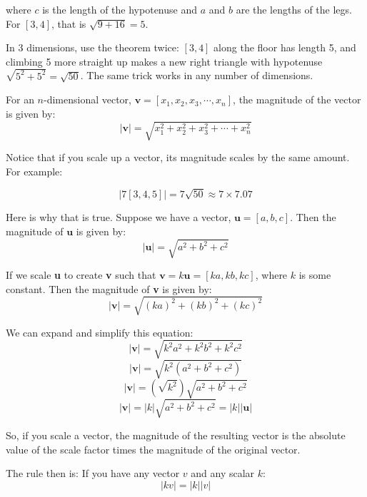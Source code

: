 where $c$ is the length of the hypotenuse and $a$ and $b$ are the lengths of
the legs. For $[3, 4]$, that is $\sqrt{9 + 16} = 5$.

In 3 dimensions, use the theorem twice: $[3, 4]$ along the floor has
length 5, and climbing 5 more straight up makes a new right triangle with
hypotenuse $\sqrt{5^2 + 5^2} = \sqrt{50}$. The same trick works in any
number of dimensions. 
\vspace*{1cm}

\begin{mdframed}[style = important, frametitle = {Magnitude of Vectors}]
For an $n$-dimensional vector, $\textbf{v} = \left[ x_1, x_2, x_3, \cdots, x_n 
\right]$, the magnitude of the vector is given by:
$$\left| \textbf{v} \right| = \sqrt{x_1^2 + x_2^2 + x_3^2 + \cdots + x_n^2}$$
\end{mdframed}

Notice that if you scale up a vector, its magnitude scales by the same amount. 
For example:

\begin{equation*}
|7[3,4,5]| = 7 \sqrt{50} \approx 7 \times 7.07    
\end{equation*}

Here is why that is true. Suppose we have a vector, $\textbf{u} = \left[a, b, 
c \right]$. Then the magnitude of $\textbf{u}$ is given by:
$$\left| \textbf{u} \right| = \sqrt{a^2 + b^2 + c^2}$$

If we scale \textbf{u} to create \textbf{v} such that $\textbf{v} = k 
\textbf{u} = \left[ ka, kb, kc \right]$, where $k$ is some constant. Then the 
magnitude of \textbf{v} is given by:
$$\left| \textbf{v} \right| = \sqrt{\left( ka \right)^2 + \left( kb \right)^2 
+ \left( kc \right)^2}$$

We can expand and simplify this equation:
$$\left| \textbf{v} \right| = \sqrt{k^2 a^2 + k^2 b^2 + k^2 c^2}$$
$$\left| \textbf{v} \right| = \sqrt{k^2 \left( a^2 + b^2 + c^2 \right)}$$
$$\left| \textbf{v} \right| = \left( \sqrt{k^2} \right) \sqrt{a^2 + b^2 + 
c^2}$$
$$\left| \textbf{v} \right| = \left| k \right| \sqrt{a^2 + b^2 + c^2} = 
\left| k \right| \left| \textbf{u} \right|$$

So, if you scale a vector, the magnitude of the resulting vector is the absolute value of the scale factor times the magnitude of the original vector. 

The rule then is: If you have any vector $v$ and any scalar $k$:
\begin{equation*}
    |k v| = |k| |v|
\end{equation*}


